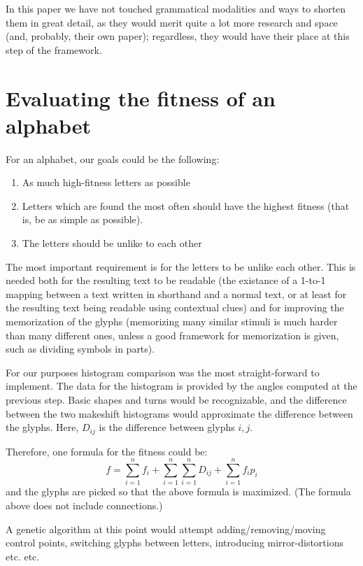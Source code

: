 \documentclass{vgtc}                          %
\begin{document}
In this paper we have not touched grammatical modalities and ways to shorten them in great detail, as they would merit quite a lot more research and space (and, probably, their own paper); regardless, they would have their place at this step of the framework. 
\section{Evaluating the fitness of an alphabet}
For an alphabet, our goals could be the following:
\begin{enumerate}
        \item As much high-fitness letters as possible
        \item Letters which are found the most often should have the highest fitness (that is, be as simple as possible).
        \item The letters should be unlike to each other
\end{enumerate}

The most important requirement is for the letters to be unlike each other. This is needed both for the resulting text to be readable (the existance of a 1-to-1 mapping between a text written in shorthand and a normal text, or at least for the resulting text being readable using contextual clues) and for improving the memorization of the glyphs (memorizing many similar stimuli is much harder than many different ones, unless a good framework for memorization is given, such as dividing symbols in parts). 

For our purposes histogram comparison was the most straight-forward to implement. The data for the histogram is provided by the angles computed at the previous step. Basic shapes and turns would be recognizable, and the difference between the two makeshift histograms would approximate the difference between the glyphs. Here, \(D_{ij}\) is the difference between glyphs \(i, j\).

Therefore, one formula for the fitness could be:
\[
f=\sum^{n}_{i=1}f_i+
\sum^{n}_{i=1}\sum^{n}_{i=1}D_{ij}+
\sum^{n}_{i=1}f_ip_i
\]
and the glyphs are picked so that the above formula is maximized. (The formula above does not include connections.)

A genetic algorithm at this point would attempt adding/removing/moving control points, switching glyphs between letters, introducing mirror-distortions etc. etc.
\end{document}
